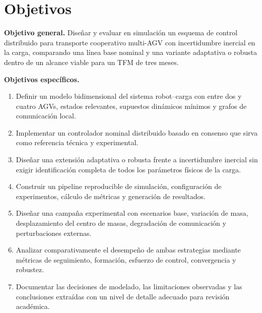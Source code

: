 \section{Objetivos}

\textbf{Objetivo general.} Diseñar y evaluar en simulación un esquema de control distribuido para transporte cooperativo multi-AGV con incertidumbre inercial en la carga, comparando una línea base nominal y una variante adaptativa o robusta dentro de un alcance viable para un TFM de tres meses.

\textbf{Objetivos específicos.}
\begin{enumerate}
  \item Definir un modelo bidimensional del sistema robot--carga con entre dos y cuatro AGVs, estados relevantes, supuestos dinámicos mínimos y grafos de comunicación local.
  \item Implementar un controlador nominal distribuido basado en consenso que sirva como referencia técnica y experimental.
  \item Diseñar una extensión adaptativa o robusta frente a incertidumbre inercial sin exigir identificación completa de todos los parámetros físicos de la carga.
  \item Construir un pipeline reproducible de simulación, configuración de experimentos, cálculo de métricas y generación de resultados.
  \item Diseñar una campaña experimental con escenarios base, variación de masa, desplazamiento del centro de masas, degradación de comunicación y perturbaciones externas.
  \item Analizar comparativamente el desempeño de ambas estrategias mediante métricas de seguimiento, formación, esfuerzo de control, convergencia y robustez.
  \item Documentar las decisiones de modelado, las limitaciones observadas y las conclusiones extraídas con un nivel de detalle adecuado para revisión académica.
\end{enumerate}
